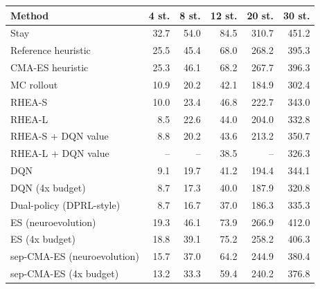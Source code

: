 \begin{tabular}{lrrrrr}
\toprule
Method & 4 st. & 8 st. & 12 st. & 20 st. & 30 st. \\
\midrule
Stay & 32.7 & 54.0 & 84.5 & 310.7 & 451.2 \\
Reference heuristic & 25.5 & 45.4 & 68.0 & 268.2 & 395.3 \\
CMA-ES heuristic & 25.3 & 46.1 & 68.2 & 267.7 & 396.3 \\
MC rollout & 10.9 & 20.2 & 42.1 & 184.9 & 302.4 \\
RHEA-S & 10.0 & 23.4 & 46.8 & 222.7 & 343.0 \\
RHEA-L & 8.5 & 22.6 & 44.0 & 204.0 & 332.8 \\
RHEA-S + DQN value & 8.8 & 20.2 & 43.6 & 213.2 & 350.7 \\
RHEA-L + DQN value & -- & -- & 38.5 & -- & 326.3 \\
DQN & 9.1 & 19.7 & 41.2 & 194.4 & 344.1 \\
DQN (4x budget) & 8.7 & 17.3 & 40.0 & 187.9 & 320.8 \\
Dual-policy (DPRL-style) & 8.7 & 16.7 & 37.0 & 186.3 & 335.3 \\
ES (neuroevolution) & 19.3 & 46.1 & 73.9 & 266.9 & 412.0 \\
ES (4x budget) & 18.8 & 39.1 & 75.2 & 258.2 & 406.3 \\
sep-CMA-ES (neuroevolution) & 15.7 & 37.0 & 64.2 & 244.9 & 380.4 \\
sep-CMA-ES (4x budget) & 13.2 & 33.3 & 59.4 & 240.2 & 376.8 \\
\bottomrule
\end{tabular}

